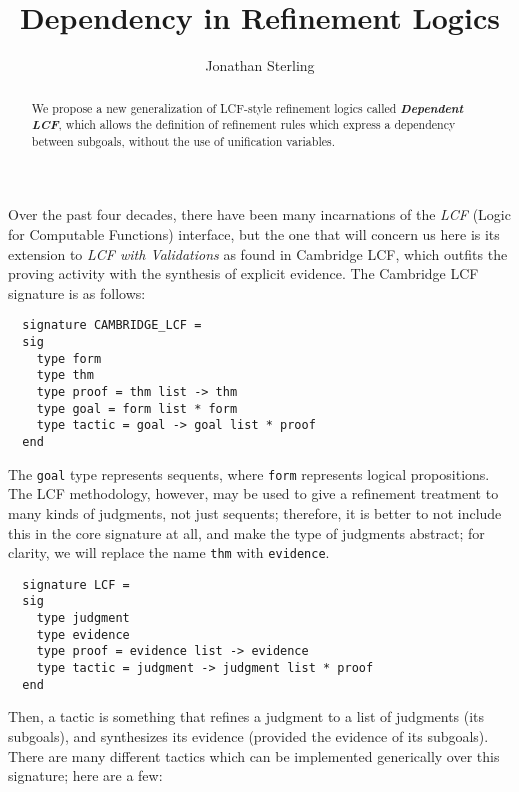 \documentclass[11pt]{amsart}
\theoremstyle{definition}
\theoremstyle{remark}
\numberwithin{equation}{section}
\newcommand\DepLCF{\textbf{\emph{Dependent LCF}}}
\begin{document}
\title{Dependency in Refinement Logics}

\author{Jonathan Sterling}
\address{}
\maketitle

\begin{abstract}

  We propose a new generalization of LCF-style refinement logics called \DepLCF,
  which allows the definition of refinement rules which express a dependency
  between subgoals, without the use of unification variables.

\end{abstract}

\onehalfspacing

Over the past four decades, there have been many incarnations of the \emph{LCF}
(Logic for Computable Functions) interface, but the one that will concern us
here is its extension to \emph{LCF with Validations} as found in Cambridge LCF,
which outfits the proving activity with the synthesis of explicit evidence.
The Cambridge LCF signature is as follows:


\begin{lstlisting}
  signature CAMBRIDGE_LCF =
  sig
    type form
    type thm
    type proof = thm list -> thm
    type goal = form list * form
    type tactic = goal -> goal list * proof
  end
\end{lstlisting}

The \verb!goal! type represents sequents, where \verb!form! represents logical
propositions. The LCF methodology, however, may be used to give a refinement
treatment to many kinds of judgments, not just sequents; therefore, it
is better to not include this in the core signature at all, and make the
type of judgments abstract; for clarity, we will replace the name \verb!thm!
with \verb!evidence!.

\begin{lstlisting}
  signature LCF =
  sig
    type judgment
    type evidence
    type proof = evidence list -> evidence
    type tactic = judgment -> judgment list * proof
  end
\end{lstlisting}

Then, a tactic is something that refines a judgment to a list of judgments (its
subgoals), and synthesizes its evidence (provided the evidence of its
subgoals). There are many different tactics which can be implemented
generically over this signature; here are a few:
\end{document}
